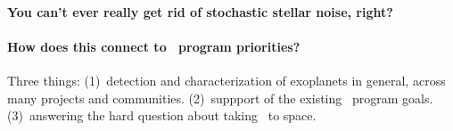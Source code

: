 \documentclass[12pt, letterpaper]{article}
\begin{document}
\paragraph{You can't ever really get rid of stochastic stellar noise, right?}

\paragraph{How does this connect to \XRP\ program priorities?}

Three things: (1)~detection and characterization of exoplanets in
general, across many projects and communities. (2)~suppport of the
existing \NNEXPLORE\ program goals. (3)~answering the hard question
about taking \EPRV\ to space.
\end{document}
